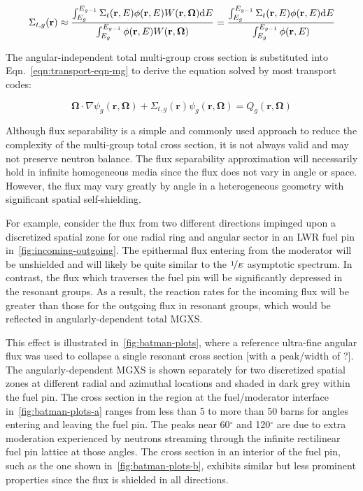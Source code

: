 \begin{dmath}
\label{eqn:sigt-mg-scalar}
\Sigma_{t,g}(\mathbf{r}) \approx \frac{\int\displaylimits_{E_{g}}^{E_{g-1}} \Sigma_{t}(\mathbf{r},E)\phi(\mathbf{r},E)W(\mathbf{r},\mathbf{\Omega})\mathrm{d}E}{\int\displaylimits_{E_{g}}^{E_{g-1}} \phi(\mathbf{r},E)W(\mathbf{r},\mathbf{\Omega})} = \frac{\int\displaylimits_{E_{g}}^{E_{g-1}} \Sigma_{t}(\mathbf{r},E)\phi(\mathbf{r},E)\mathrm{d}E}{\int\displaylimits_{E_{g}}^{E_{g-1}} \phi(\mathbf{r},E)}
\end{dmath}

\noindent The angular-independent total multi-group cross section is substituted into Eqn.~\ref{eqn:transport-eqn-mg} to derive the equation solved by most transport codes:

\begin{dmath}
\label{eqn:transport-eqn-mg-separate}
\mathbf{\Omega} \cdot \nabla \psi_{g}(\mathbf{r},\mathbf{\Omega}) + \Sigma_{t,g}(\mathbf{r})\psi_{g}(\mathbf{r},\mathbf{\Omega}) = Q_{g}(\mathbf{r},\mathbf{\Omega})
\end{dmath}

Although flux separability is a simple and commonly used approach to reduce the complexity of the multi-group total cross section, it is not always valid and may not preserve neutron balance. The flux separability approximation will necessarily hold in infinite homogeneous media since the flux does not vary in angle or space. However, the flux may vary greatly by angle in a heterogeneous geometry with significant spatial self-shielding.

For example, consider the flux from two different directions impinged upon a discretized spatial zone for one radial ring and angular sector in an LWR fuel pin in~\autoref{fig:incoming-outgoing}. The epithermal flux entering from the moderator will be unshielded and will likely be quite similar to the $\nicefrac{1}{E}$ asymptotic spectrum. In contrast, the flux which traverses the fuel pin will be significantly depressed in the resonant groups. As a result, the reaction rates for the incoming flux will be greater than those for the outgoing flux in resonant groups, which would be reflected in angularly-dependent total MGXS.

This effect is illustrated in~\autoref{fig:batman-plots}, where a reference ultra-fine angular flux was used to collapse a single resonant cross section {\color{red}[with a peak/width of ?]}. The angularly-dependent MGXS is shown separately for two discretized spatial zones at different radial and azimuthal locations and shaded in dark grey within the fuel pin. The cross section in the region at the fuel/moderator interface in~\autoref{fig:batman-plots-a} ranges from less than 5 to more than 50 barns for angles entering and leaving the fuel pin. The peaks near 60$^{\circ}$ and 120$^{\circ}$ are due to extra moderation experienced by neutrons streaming through the infinite rectilinear fuel pin lattice at those angles. The cross section in an interior of the fuel pin, such as the one shown in~\autoref{fig:batman-plots-b}, exhibits similar but less prominent properties since the flux is shielded in all directions.

